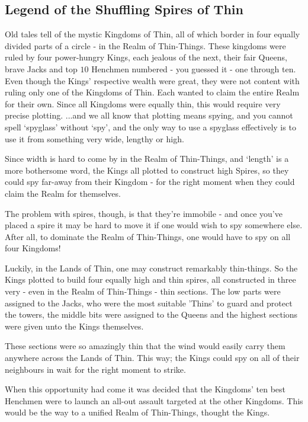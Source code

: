
\subsection{Legend of the Shuffling Spires of Thin}
\label{sec:legendoftheshufflingspiresofthin}
Old tales tell of the mystic Kingdoms of Thin, all of which border in four equally divided parts of a circle - in the Realm of Thin-Things.
These kingdoms were ruled by four power-hungry Kings, each jealous of the next, their fair Queens, brave Jacks and top $10$ Henchmen numbered - you guessed it - one through ten.
Even though the Kings’ respective wealth were great, they were not content with ruling only one of the Kingdoms of Thin. Each wanted to claim the entire Realm for their own. Since all Kingdoms were equally thin, this would require very precise plotting.
...and we all know that plotting means spying, and you cannot spell ‘spyglass’ without ‘spy’, and the only way to use a spyglass effectively is to use it from something very wide, lengthy or high.

Since width is hard to come by in the Realm of Thin-Things, and ‘length’ is a more bothersome word, the Kings all plotted to construct high Spires, so they could spy far-away from their Kingdom - for the right moment when they could claim the Realm for themselves.

The problem with spires, though, is that they’re immobile - and once you’ve placed a spire it may be hard to move it if one would wish to spy somewhere else.
After all, to dominate the Realm of Thin-Things, one would have to spy on all four Kingdoms!

Luckily, in the Lands of Thin, one may construct remarkably thin-things.
So the Kings plotted to build four equally high and thin spires, all constructed in three very - even in the Realm of Thin-Things - thin sections.
The low parts were assigned to the Jacks, who were the most suitable 'Thins' to guard and protect the towers, the middle bits were assigned to the Queens and the highest sections were given unto the Kings themselves.

These sections were so amazingly thin that the wind would easily carry them anywhere across the Lands of Thin. This way; the Kings could spy on all of their neighbours in wait for the right moment to strike.

When this opportunity had come it was decided that the Kingdoms’ ten best Henchmen were to launch an all-out assault targeted at the other Kingdoms.
This would be the way to a unified Realm of Thin-Things, thought the Kings.

